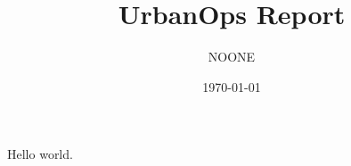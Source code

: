 \documentclass{article}
\title{UrbanOps Report}
\author{NOONE}
\date{\today}
\begin{document}
\maketitle

Hello world.
\end{document}
